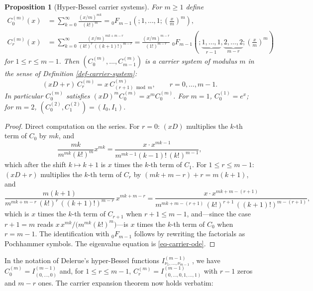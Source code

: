 \documentclass[a4paper]{amsart}
\numberwithin{equation}{section}
\newtheorem{proposition}[theorem]{Proposition}
\begin{document}
\begin{proposition}[Hyper-Bessel carrier systems]\label{prop-hyper-bessel}
For $m \geq 1$ define
\[
\begin{aligned}
C^{(m)}_0(x) &= \sum_{k=0}^\infty \frac{(x/m)^{mk}}{(k!)^m} = {}_0F_{m-1}\!\left(;1,\ldots,1;\left(\frac{x}{m}\right)^{m}\right), \\
C^{(m)}_r(x) &= \sum_{k=0}^\infty \frac{(x/m)^{mk+m-r}}{(k!)^{r}\,((k+1)!)^{m-r}} = \frac{(x/m)^{m-r}}{(1!)^{m-r}}\; {}_0F_{m-1}\!\left(;\underbrace{1,\ldots,1}_{r-1},\underbrace{2,\ldots,2}_{m-r};\left(\frac{x}{m}\right)^{m}\right)
\end{aligned}
\]
for $1 \le r \le m-1$. Then $(C^{(m)}_0, \ldots, C^{(m)}_{m-1})$ is a carrier system of modulus $m$ in the sense of Definition \ref{def-carrier-system}:
\[
(xD + r)\,C^{(m)}_r = x\, C^{(m)}_{(r+1) \bmod m}, \qquad r = 0, \ldots, m-1.
\]
In particular $C^{(m)}_0$ satisfies $(xD)^m C^{(m)}_0 = x^m C^{(m)}_0$. For $m=1$, $C^{(1)}_0 = e^x$; for $m = 2$, $(C^{(2)}_0, C^{(2)}_1) = (I_0, I_1)$.
\end{proposition}
\begin{proof}
Direct computation on the series. For $r = 0$: $(xD)$ multiplies the $k$-th term of $C_0$ by $mk$, and
\[
\frac{mk}{m^{mk}(k!)^m}x^{mk} = \frac{x \cdot x^{mk-1}}{m^{mk-1}(k-1)!\,(k!)^{m-1}},
\]
which after the shift $k \mapsto k+1$ is $x$ times the $k$-th term of $C_1$. For $1 \le r \le m-1$: $(xD + r)$ multiplies the $k$-th term of $C_r$ by $(mk + m - r) + r = m(k+1)$, and
\[
\frac{m(k+1)}{m^{mk+m-r}\,(k!)^r\,((k+1)!)^{m-r}}\,x^{mk+m-r} = \frac{x\cdot x^{mk+m-(r+1)}}{m^{mk+m-(r+1)}\,(k!)^{r+1}\,((k+1)!)^{m-(r+1)}},
\]
which is $x$ times the $k$-th term of $C_{r+1}$ when $r + 1 \le m - 1$, and---since the case $r+1 = m$ reads $x\, x^{mk}/\big(m^{mk}(k!)^{m}\big)$---is $x$ times the $k$-th term of $C_0$ when $r = m-1$. The identification with ${}_0F_{m-1}$ follows by rewriting the factorials as Pochhammer symbols. The eigenvalue equation is \eqref{eq-carrier-ode}.
\end{proof}

In the notation of Delerue's hyper-Bessel functions $I^{(m-1)}_{\nu_1,\ldots,\nu_{m-1}}$ \cite{delerue1953, kiryakova1994}, we have $C^{(m)}_0 = I^{(m-1)}_{(0,\ldots,0)}$ and, for $1 \le r \le m-1$, $C^{(m)}_r = I^{(m-1)}_{(0,\ldots,0,1,\ldots,1)}$ with $r-1$ zeros and $m-r$ ones. The carrier expansion theorem now holds verbatim:
\end{document}
